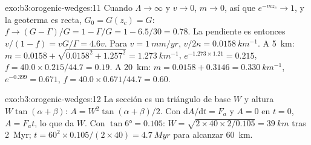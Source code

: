 \begin{solution}{exo:b3:orogenic-wedges:11}
Cuando $\Lambda \to \infty$ y $v \to 0$, $m \to 0$, así que $e^{-mz_c} \to 1$, y
la geoterma es recta, $G_0 = G(z_c) = G$: $f \to (G - \Gamma)/G = 1 -
\Gamma/G = 1 - 6.5/30 = 0.78$. La pendiente es entonces $v/(1 - f) = vG/\Gamma =
4.6v$. Para $v = \qty{1}{mm/yr}$, $v/2\kappa = \qty{0.0158}{km^{-1}}$. A
\qty{5}{km}: $m = 0.0158 + \sqrt{0.0158^2 + 1.257^2} = \qty{1.273}{km^{-1}}$,
$e^{-1.273\times1.21} = 0.215$, $f = 40.0\times0.215/44.7 = 0.19$. A
\qty{20}{km}: $m = 0.0158 + 0.3146 = \qty{0.330}{km^{-1}}$, $e^{-0.399} =
0.671$, $f = 40.0\times0.671/44.7 = 0.60$.
\end{solution}

\begin{solution}{exo:b3:orogenic-wedges:12}
La sección es un triángulo de base $W$ y altura $W\tan(\alpha + \beta)$:
$A = W^2\tan(\alpha + \beta)/2$. Con $\mathrm dA/\mathrm dt = F_a$ y $A =
0$ en $t = 0$, $A = F_at$, lo que da $W$. Con $\tan\ang{6} = 0.105$:
$W = \sqrt{2\times40\times2/0.105} = \qty{39}{km}$ tras \qty{2}{Myr}; $t =
60^2\times0.105/(2\times40) = \qty{4.7}{Myr}$ para alcanzar \qty{60}{km}.
\end{solution}

